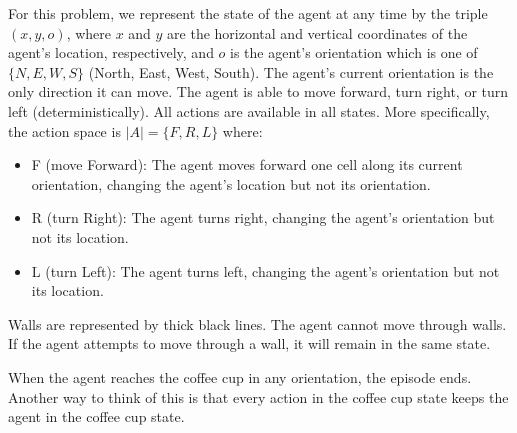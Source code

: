For this problem, we represent the state of the agent at any time by the triple $(x, y, o)$, where $x$ and $y$ are the horizontal and vertical coordinates of the agent's location, respectively, and $o$ is the agent's orientation which is one of $\{ N, E, W, S \}$ (North, East, West, South). The agent's current orientation is the only direction it can move. The agent is able to move forward, turn right, or turn left (deterministically). All actions are available in all states. More specifically, the action space is $|A| = \{F,R,L\}$ where:
\begin{itemize}
\item F (move Forward): The agent moves forward one cell along its current orientation, changing the agent's location but not its orientation.
\item R (turn Right): The agent turns right, changing the agent's orientation but not its location.
\item L (turn Left): The agent turns left, changing the agent's orientation but not its location.
\end{itemize}
Walls are represented by thick black lines. The agent cannot move through walls. If the agent attempts to move through a wall,  it will remain in the same state.

When the agent reaches the coffee cup in any orientation, the episode ends. Another way to think of this is that every action in the coffee cup state keeps the agent in the coffee cup state.


